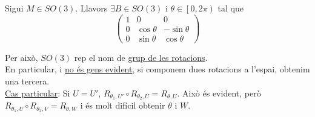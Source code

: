\documentclass[a4paper,12pt]{article}
\begin{document}
\begin{itemize}
	    \begin{teorema}
	        Sigui $M\in SO(3)$. Llavors $\exists B \in SO(3)$ i $\theta \in \left[0, 2\pi\right)$ tal que
	        \begin{displaymath}
	            \begin{pmatrix}
	                1 & 0 & 0\\
	                0 & \cos{\theta} & -\sin{\theta}\\
	                0 & \sin{\theta} & \cos{\theta}
	            \end{pmatrix}
	        \end{displaymath}
	    \end{teorema}

	    Per això, $SO(3)$ rep el nom de \underline{grup de les rotacions}.\\
	    En particular, i \underline{no és gens evident}, si componem dues rotacions a l'espai, obtenim
	    una tercera.\\

	    \underline{Cas particular}: Si $U = U'$, $R_{\theta_1,U'}\circ R_{\theta_2,U} = R_{\theta,U}$.
	    Això és evident, però $R_{\theta_1,U}\circ R_{\theta_2,V} = R_{\theta,W}$ i és molt difícil
	    obtenir $\theta$ i $W$.
	\end{itemize}
\end{document}
